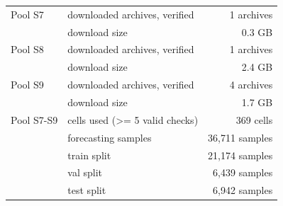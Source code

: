 \begin{table}[t]
\begin{tabular}{llr}
    Pool S7 & downloaded archives, verified & 1 archives \\
     & download size & 0.3 GB \\
    Pool S8 & downloaded archives, verified & 1 archives \\
     & download size & 2.4 GB \\
    Pool S9 & downloaded archives, verified & 4 archives \\
     & download size & 1.7 GB \\
    Pool S7-S9 & cells used (>= 5 valid checks) & 369 cells \\
     & forecasting samples & 36,711 samples \\
     &   train split & 21,174 samples \\
     &   val split & 6,439 samples \\
     &   test split & 6,942 samples \\
    \bottomrule
  \end{tabular}
\end{table}
